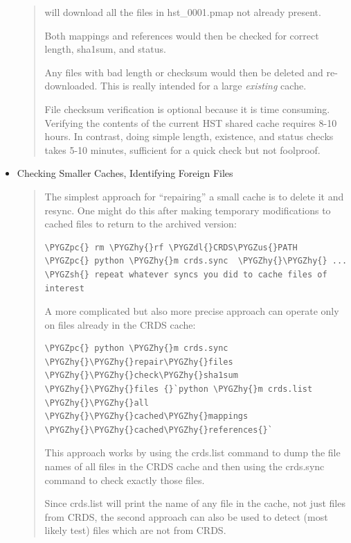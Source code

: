 \documentclass[letterpaper,10pt,english]{sphinxmanual}
\def\PYGZus{\char`\_}
\def\PYGZsh{\char`\#}
\def\PYGZpc{\char`\%}
\def\PYGZdl{\char`\$}
\def\PYGZhy{\char`\-}
\begin{document}
\begin{itemize}
\begin{quote}
will download all the files in hst\_0001.pmap not already present.

Both mappings and references would then be checked for correct length, sha1sum, and status.

Any files with bad length or checksum would then be deleted and re-downloaded.   This is really intended
for a large \emph{existing} cache.

File checksum verification is optional because it is time consuming.  Verifying the contents of the current
HST shared cache requires 8-10 hours.   In contrast, doing simple length, existence, and status checks
takes 5-10 minutes,  sufficient for a quick check but not foolproof.
\end{quote}

\item {} 
Checking Smaller Caches,  Identifying Foreign Files
\begin{quote}

The simplest approach for ``repairing'' a small cache is to delete it and resync.   One might do this
after making temporary modifications to cached files to return to the archived version:

\begin{Verbatim}[commandchars=\\\{\}]
\PYGZpc{} rm \PYGZhy{}rf \PYGZdl{}CRDS\PYGZus{}PATH
\PYGZpc{} python \PYGZhy{}m crds.sync  \PYGZhy{}\PYGZhy{} ...  \PYGZsh{} repeat whatever syncs you did to cache files of interest
\end{Verbatim}

A more complicated but also more precise approach can operate only on files already in the CRDS cache:

\begin{Verbatim}[commandchars=\\\{\}]
\PYGZpc{} python \PYGZhy{}m crds.sync \PYGZhy{}\PYGZhy{}repair\PYGZhy{}files \PYGZhy{}\PYGZhy{}check\PYGZhy{}sha1sum \PYGZhy{}\PYGZhy{}files {}`python \PYGZhy{}m crds.list \PYGZhy{}\PYGZhy{}all \PYGZhy{}\PYGZhy{}cached\PYGZhy{}mappings \PYGZhy{}\PYGZhy{}cached\PYGZhy{}references{}`
\end{Verbatim}

This approach works by using the crds.list command to dump the file names of all files in the CRDS cache
and then using the crds.sync command to check exactly those files.

Since crds.list will print the name of any file in the cache,  not just files from CRDS,  the second approach can
also be used to detect (most likely test) files which are not from CRDS.


\end{quote}
\end{itemize}
\end{document}
